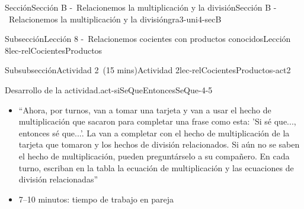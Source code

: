 \documentclass[oneside,10pt,]{article}
\newcommand{\blocktitlefont}{\relax}
\newlength{\fillinmaxwidth}
\newlength{\fillincontract}
\newlength{\charmaxwidth}\setlength{\charmaxwidth}{0.5em}
\newlength{\charminwidth}\setlength{\charminwidth}{0.1em}
\newlength{\fillinheight}
\newcommand{\fillintext}[1]{%
\setlength{\fillinmaxwidth}{#1\charmaxwidth}%
\setlength{\fillincontract}{#1\charminwidth}%
\setlength{\fillinheight}{\baselineskip}\addtolength{\fillinheight}{1.2pt}%
\strut\nobreak\leaders\vbox{\hrule width 0.3pt height 0.3pt \vskip -1.2pt}\hskip 1\fillinmaxwidth minus \fillincontract\nobreak\strut%
}
\begin{document}
\begin{sectionptx}{Sección}{Sección B -~Relacionemos la multiplicación y la división}{}{Sección B -~Relacionemos la multiplicación y la división}{}{}{gra3-uni4-secB}
\begin{subsectionptx}{Subsección}{Lección 8 -~Relacionemos cocientes con productos conocidos}{}{Lección 8}{}{}{lec-relCocientesProductos}
\begin{subsubsectionptx}{Subsubsección}{Actividad 2~(15 mins)}{}{Actividad 2}{}{}{lec-relCocientesProductos-act2}
\begin{paragraphs}{Desarrollo de la actividad.}{act-siSeQueEntoncesSeQue-4-5}
\begin{itemize}[label=\textbullet]
\item{}``Ahora, por turnos, van a tomar una tarjeta y van a usar el hecho de multiplicación que sacaron para completar una frase como esta: 'Si sé que..., entonces sé que...'. La van a completar con el hecho de multiplicación de la tarjeta que tomaron y los hechos de división relacionados. Si aún no se saben el hecho de multiplicación, pueden preguntárselo a su compañero. En cada turno, escriban en la tabla la ecuación de multiplicación y las ecuaciones de división relacionadas''%
\item{}7–10 minutos: tiempo de trabajo en pareja%
\end{itemize}
\end{paragraphs}%
\end{subsubsectionptx}
\end{subsectionptx}
\end{sectionptx}
\end{document}
